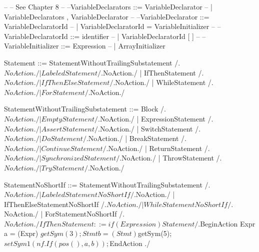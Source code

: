     --
    -- See Chapter 8
    --
    --VariableDeclarators ::= VariableDeclarator
    --                      | VariableDeclarators , VariableDeclarator
    --
    --VariableDeclarator ::= VariableDeclaratorId
    --                     | VariableDeclaratorId = VariableInitializer
    --
    --VariableDeclaratorId ::= identifier
    --                       | VariableDeclaratorId [ ]
    --
    --VariableInitializer ::= Expression
    --                      | ArrayInitializer
    
    Statement ::= StatementWithoutTrailingSubstatement
        /.$NoAction./
                | LabeledStatement
        /.$NoAction./
                | IfThenStatement
        /.$NoAction./
                | IfThenElseStatement
        /.$NoAction./
                | WhileStatement
        /.$NoAction./
                | ForStatement
        /.$NoAction./
    
    StatementWithoutTrailingSubstatement ::= Block
        /.$NoAction./
                                           | EmptyStatement
        /.$NoAction./
                                           | ExpressionStatement
        /.$NoAction./
                                           | AssertStatement
        /.$NoAction./
                                           | SwitchStatement
        /.$NoAction./
                                           | DoStatement
        /.$NoAction./
                                           | BreakStatement
        /.$NoAction./
                                           | ContinueStatement
        /.$NoAction./
                                           | ReturnStatement
        /.$NoAction./
                                           | SynchronizedStatement
        /.$NoAction./
                                           | ThrowStatement
        /.$NoAction./
                                           | TryStatement
        /.$NoAction./
    
    StatementNoShortIf ::= StatementWithoutTrailingSubstatement
        /.$NoAction./
                         | LabeledStatementNoShortIf
        /.$NoAction./
                         | IfThenElseStatementNoShortIf
        /.$NoAction./
                         | WhileStatementNoShortIf
        /.$NoAction./
                         | ForStatementNoShortIf
        /.$NoAction./
    
    IfThenStatement ::= if ( Expression ) Statement
        /.$BeginAction
                    Expr a = (Expr) $getSym(3);
                    Stmt b = (Stmt) $getSym(5);
                    $setSym1(nf.If(pos(), a, b));
          $EndAction
        ./
    
